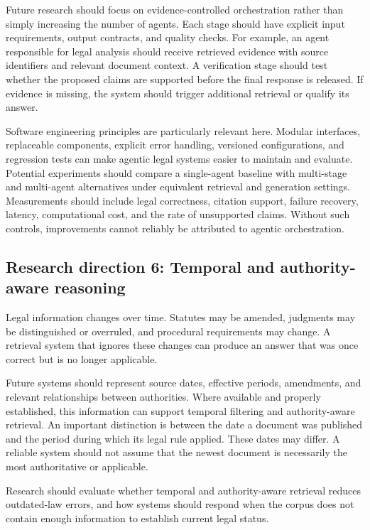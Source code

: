 Future research should focus on evidence-controlled orchestration rather than simply increasing the number
of agents. Each stage should have explicit input requirements, output contracts, and quality checks. For
example, an agent responsible for legal analysis should receive retrieved evidence with source identifiers
and relevant document context. A verification stage should test whether the proposed claims are supported
before the final response is released. If evidence is missing, the system should trigger additional
retrieval or qualify its answer.

Software engineering principles are particularly relevant here. Modular interfaces, replaceable
components, explicit error handling, versioned configurations, and regression tests can make agentic legal
systems easier to maintain and evaluate. Potential experiments should compare a single-agent baseline with
multi-stage and multi-agent alternatives under equivalent retrieval and generation settings. Measurements
should include legal correctness, citation support, failure recovery, latency, computational cost, and the
rate of unsupported claims. Without such controls, improvements cannot reliably be attributed to agentic
orchestration.

\subsection{Research direction 6: Temporal and authority-aware reasoning}

Legal information changes over time. Statutes may be amended, judgments may be distinguished or overruled,
and procedural requirements may change. A retrieval system that ignores these changes can produce an
answer that was once correct but is no longer applicable.

Future systems should represent source dates, effective periods, amendments, and relevant relationships
between authorities. Where available and properly established, this information can support temporal
filtering and authority-aware retrieval. An important distinction is between the date a document was
published and the period during which its legal rule applied. These dates may differ. A reliable system
should not assume that the newest document is necessarily the most authoritative or applicable.

Research should evaluate whether temporal and authority-aware retrieval reduces outdated-law errors, and
how systems should respond when the corpus does not contain enough information to establish current legal
status.

